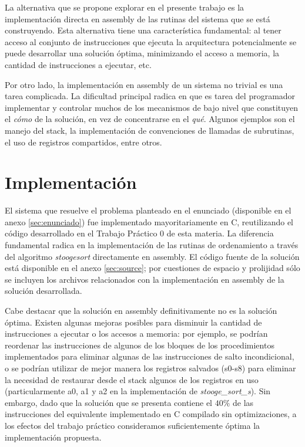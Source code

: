 \documentclass[a4paper,11pt]{article}
\begin{document}
La alternativa que se propone explorar en el presente trabajo es la
implementación directa en assembly de las rutinas del sistema que se está
construyendo. Esta alternativa tiene una característica fundamental: al tener
acceso al conjunto de instrucciones que ejecuta la arquitectura potencialmente
se puede desarrollar una solución óptima, minimizando el acceso a memoria, la
cantidad de instrucciones a ejecutar, etc.

Por otro lado, la implementación en assembly de un sistema no trivial es una
tarea complicada. La dificultad principal radica en que es tarea del
programador implementar y controlar muchos de los mecanismos de bajo nivel que
constituyen el \textit{cómo} de la solución, en vez de concentrarse en el
\textit{qué}. Algunos ejemplos son el manejo del stack, la implementación de
convenciones de llamadas de subrutinas, el uso de registros compartidos, entre
otros.

\section{Implementación}

El sistema que resuelve el problema planteado en el enunciado (disponible en el
anexo \ref{sec:enunciado}) fue implementado mayoritariamente en C, reutilizando
el código desarrollado en el Trabajo Práctico 0 de esta materia. La diferencia
fundamental radica en la implementación de las rutinas de ordenamiento a través
del algoritmo \textit{stoogesort} directamente en assembly. El código fuente de
la solución está disponible en el anexo \ref{sec:source}; por cuestiones de
espacio y prolijidad sólo se incluyen los archivos relacionados con la
implementación en assembly de la solución desarrollada.

Cabe destacar que la solución en assembly definitivamente no es la solución
óptima. Existen algunas mejoras posibles para disminuir la cantidad de
instrucciones a ejecutar o los accesos a memoria: por ejemplo, se podrían
reordenar las instrucciones de algunos de los bloques de los procedimientos
implementados para eliminar algunas de las instrucciones de salto
incondicional, o se podrían utilizar de mejor manera los registros salvados
(s0-s8) para eliminar la necesidad de restaurar desde el stack algunos de los
registros en uso (particularmente a0, a1 y a2 en la implementación de
\textit{stooge\_sort\_s}). Sin embargo, dado que la solución que se presenta
contiene el \(40\%\) de las instrucciones del equivalente implementado en C
compilado sin optimizaciones, a los efectos del trabajo práctico consideramos
suficientemente óptima la implementación propuesta.
\end{document}
